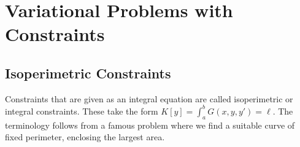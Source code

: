 \documentclass[11pt]{penrose}
\begin{document}


\section{Variational Problems with Constraints}

\subsection{Isoperimetric Constraints}
Constraints that are given as an integral equation are called isoperimetric or integral constraints. These take the form $K[y] = \int_a^b G(x,y,y') = \ell$. The terminology follows from a famous problem where we find a suitable curve of fixed perimeter, enclosing the largest area.
\end{document}
